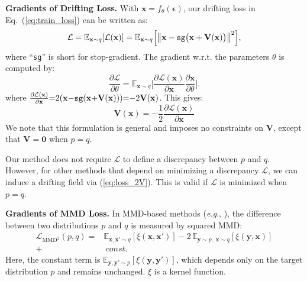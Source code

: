 \documentclass{article}
\newcommand{\vv}[1]{\mathbf{#1}}
\newcommand{\x}{\vv{x}}
\newcommand{\y}{\vv{y}}
\newcommand{\V}{\vv{V}}
\newcommand{\e}{{\boldsymbol{\epsilon}}}
\renewcommand{\paragraph}[1]{\vspace{.05em}\noindent\textbf{#1}}
\def\onedot{.}
\def\eg{\emph{e.g}\onedot} \def\Eg{\emph{E.g}\onedot}
\theoremstyle{plain}
\theoremstyle{definition}
\theoremstyle{remark}
\begin{document}
\paragraph{Gradients of Drifting Loss.}
With $\x=f_\theta(\e)$, our drifting loss in Eq.~(\ref{eq:train_loss}) can be written as:
\begin{equation}
\mathcal{L}
=
\mathbb{E}_{\x{\sim}q}
[
\mathcal{L}(\x)
]
=
\mathbb{E}_{\x{\sim}q}
\Big[
\big\|
\x
-
\text{\texttt{sg}}\big(
\x
+
\V(\x)
\big)
\big\|^2
\Big],
\end{equation}
where ``\texttt{sg}'' is short for stop-gradient. The gradient w.r.t. the parameters $\theta$ is computed by:
\begin{equation}
\frac{\partial\mathcal L }{\partial {\theta}} =
\mathbb{E}_{\x{\sim}q}\Big[
\frac{\partial\mathcal L(\x) }{\partial {\x}} \frac{\partial\x}{\partial\theta}
\Big].
\end{equation}
where
$
\frac{\partial\mathcal L(\x) }{\partial {\x}}{=}2
(
\x
{-}
\text{\texttt{sg}}(
\x
{+}
\V(\x)
)
)
{=}{-}2\V(\x)
$. This gives:
\begin{equation}
\label{eq:loss_2V}
\V(\x) = -\frac{1}{2}\frac{\partial\mathcal L(\x) }{\partial {\x}}
\end{equation}
We note that this formulation is general and imposes no constraints on $\V$, except that $\V=\textbf{0}$ when $p=q$.

Our method does not require $\mathcal{L}$ to define a discrepancy between $p$ and $q$. However, for other methods that depend on minimizing a discrepancy $\mathcal{L}$, we can induce a drifting field via (\ref{eq:loss_2V}). This is valid if $\mathcal{L}$ is minimized when $p=q$.

\paragraph{Gradients of MMD Loss.}
\newcommand{\kk}{\xi}
\newcommand{\LMMD}{\mathcal{L}_{\text{MMD}^2}}
In MMD-based methods (\eg, \citealt{li2015generative}), the difference between two distributions $p$ and $q$ is measured by squared MMD:
\begin{equation}
\label{eq:mmd2_def}
\begin{aligned}
\LMMD(p,q)
= &
\mathbb{E}_{\x,\x'\sim q}[\kk(\x,\x')]
-2\,\mathbb{E}_{\y\sim p,\;\x\sim q}[\kk(\y,\x)]
\\
+ &~const.
\end{aligned}
\end{equation}
Here, the constant term is $\mathbb{E}_{\y,\y'\sim p}[\kk(\y,\y')]$, which depends only on the target distribution $p$ and remains unchanged. $\kk$ is a kernel function.
\end{document}
